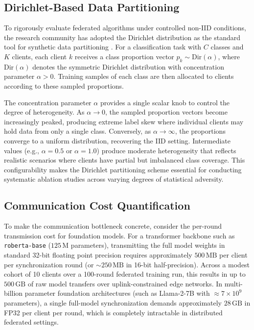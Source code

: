 \subsection{Dirichlet-Based Data Partitioning}
\label{sec:dirichlet}
To rigorously evaluate federated algorithms under controlled non-IID conditions, the research community has adopted the Dirichlet distribution as the standard tool for synthetic data partitioning \cite{hsu2019measuring, yurochkin2019bayesian, zhu2021federated}. For a classification task with $C$ classes and $K$ clients, each client $k$ receives a class proportion vector $p_k \sim \text{Dir}(\alpha)$, where $\text{Dir}(\alpha)$ denotes the symmetric Dirichlet distribution with concentration parameter $\alpha > 0$. Training samples of each class are then allocated to clients according to these sampled proportions.

The concentration parameter $\alpha$ provides a single scalar knob to control the degree of heterogeneity. As $\alpha \to 0$, the sampled proportion vectors become increasingly peaked, producing extreme label skew where individual clients may hold data from only a single class. Conversely, as $\alpha \to \infty$, the proportions converge to a uniform distribution, recovering the IID setting. Intermediate values (e.g., $\alpha = 0.5$ or $\alpha = 1.0$) produce moderate heterogeneity that reflects realistic scenarios where clients have partial but imbalanced class coverage. This configurability makes the Dirichlet partitioning scheme essential for conducting systematic ablation studies across varying degrees of statistical adversity.

\subsection{Communication Cost Quantification}
\label{sec:comm_cost}
To make the communication bottleneck concrete, consider the per-round transmission cost for foundation models. For a transformer backbone such as \texttt{roberta-base} ($125\,\text{M}$ parameters), transmitting the full model weights in standard 32-bit floating point precision requires approximately $500\,\text{MB}$ per client per synchronization round (or $\sim 250\,\text{MB}$ in 16-bit half-precision). Across a modest cohort of 10 clients over a 100-round federated training run, this results in up to $500\,\text{GB}$ of raw model transfers over uplink-constrained edge networks. In multi-billion parameter foundation architectures (such as Llama-2-7B with $\approx 7\times 10^9$ parameters), a single full-model synchronization demands approximately $28\,\text{GB}$ in FP32 per client per round, which is completely intractable in distributed federated settings.

